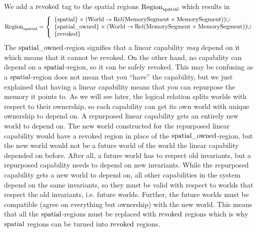 \begin{jversion}
We add a $\mathrm{revoked}$ tag to the spatial regions $\mathrm{Region}_\mathrm{spatial}$ which results in
\[
  \mathrm{Region}_\mathrm{spatial} = \left\{
  \begin{array}{l}
    \{\mathrm{spatial} \} \times (\mathrm{World} \rightarrow \mathrm{Rel}(\mathrm{MemorySegment} \times \mathrm{MemorySegment})) \cup \\
    \{\mathrm{spatial\_owned} \} \times (\mathrm{World} \rightarrow \mathrm{Rel}(\mathrm{MemorySegment} \times \mathrm{MemorySegment})) \cup \\
    \{\mathrm{revoked} \}
  \end{array} \right.
\]
The $\mathrm{spatial\_owned}$-region signifies that a linear capability \emph{may} depend on it which means that it cannot be revoked.
On the other hand, no capability can depend on a $\mathrm{spatial}$-region, so it can be safely revoked.
This may be confusing as a $\mathrm{spatial}$-region does not mean that you ``have'' the capability, but we just explained that having a linear capability means that you can repurpose the memory it points to.
As we will see later, the logical relation splits worlds with respect to their ownership, so each capability can get its own world with unique ownership to depend on.
A repurposed linear capability gets an entirely new world to depend on.
The new world constructed for the repurposed linear capability would have a revoked region in place of the $\mathrm{spatial\_owned}$-region, but the new world would not be a future world of the world the linear capability depended on before.
After all, a future world has to respect old invariants, but a repurposed capability needs to depend on new invariants.
While the repurposed capability gets a new world to depend on, all other capabilities in the system depend on the same invariants, so they must be valid with respect to worlds that respect the old invariants, i.e. future worlds.
Further, the future worlds must be compatible (agree on everything but ownership) with the new world.
This means that all the $\mathrm{spatial}$-regions must be replaced with $\mathrm{revoked}$ regions which is why $\mathrm{spatial}$ regions can be turned into $\mathrm{revoked}$ regions.


\end{jversion}
